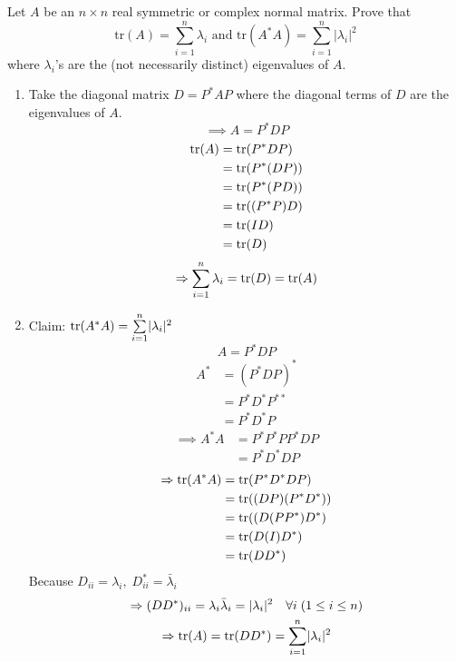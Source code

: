 Let $A$ be an $n \times n$ real symmetric or complex normal
matrix. Prove that
\[
\text{tr}(A) = \sum\limits_{i=1}^n \lambda_i \text{ and }
\text{tr}(A^*A) = \sum\limits_{i=1}^n\lvert \lambda_i \rvert^2
\]
where $\lambda_i$'s are the (not necessarily distinct) eigenvalues of $A.$
\begin{enumerate}
\item Take the diagonal matrix $D = P^*AP$ where the diagonal terms of
  $D$ are the eigenvalues of $A.$
\begin{equation}
\implies A = P^*DP
\end{equation}
\begin{align}
\text{tr}({A}) &= \text{tr}({P^*DP})\\
&=\text{tr}({P^*(DP)})\\
&=\text{tr}({P^*(PD)})\\
&=\text{tr}({(P^*P)D})\\
&=\text{tr}({ID})\\
&=\text{tr}({D})
\end{align}
\begin{equation}
\Rightarrow \sum\limits_{i=1}^n \lambda_i = \text{tr}({D}) = \text{tr}({A})
\end{equation}
\item Claim: $\text{tr}({A^*A}) = \sum\limits_{i=1}^n\lvert \lambda_i\rvert^2$
\begin{equation}
A = P^*DP
\end{equation}
\begin{align}
A^* &= (P^*DP)^*\\
&=P^*D^*P^{**}\\
&= P^*D^*P
\end{align}
\begin{align}
\implies A^*A &= P^*P^*PP^*DP\\
&= P^*D^*DP
\end{align}
\begin{align}
\Rightarrow \text{tr}({A^*A}) &= \text{tr}({P^*D^*DP})\\
&= \text{tr}({(DP)(P^*D^*)})\\
&= \text{tr}({(D(PP^*)D^*})\\
&= \text{tr}({D(I)D^*})\\
&= \text{tr}({DD^*})
\end{align}
Because $D_{ii} = \lambda_i,\; D_{ii}^* = \bar{\lambda}_i$
\begin{gather}
\Rightarrow (DD^*)_{ii} = \lambda_i\bar{\lambda}_i = \lvert
\lambda_i\rvert^2\quad \forall i\; (1\leq i \leq n)\\
\Rightarrow \text{tr}({A}) = \text{tr}({DD^*}) = \sum\limits_{i=1}^n\lvert \lambda_i\rvert^2
\end{gather}
\end{enumerate}
